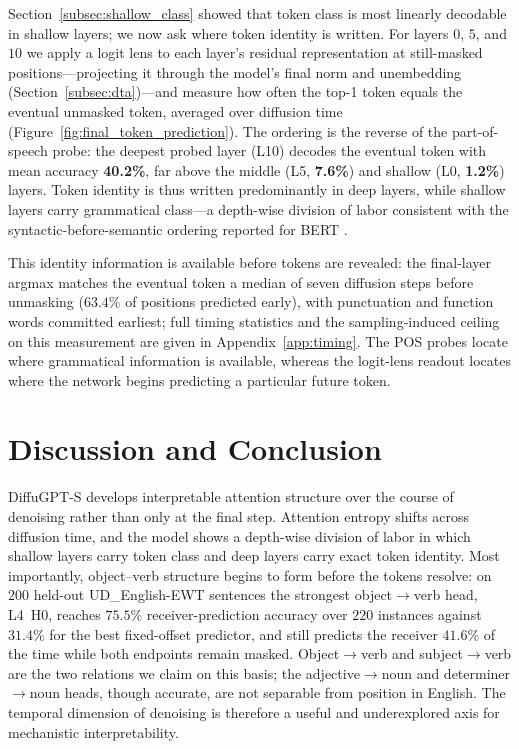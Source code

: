 \documentclass{article} %
\begin{document}
Section~\ref{subsec:shallow_class} showed that token class is most linearly
decodable in shallow layers; we now ask where token identity is written. For
layers $0$, $5$, and $10$ we apply a logit lens \citep{nostalgebraist2020logitlens} to each layer's residual
representation at still-masked positions---projecting it through the model's final
norm and unembedding (Section~\ref{subsec:dta})---and measure how often the top-1
token equals the eventual unmasked token, averaged over diffusion time
(Figure~\ref{fig:final_token_prediction}). The ordering is the reverse of the
part-of-speech probe: the deepest probed layer (L10) decodes the eventual token
with mean accuracy \textbf{40.2\%}, far above the middle (L5, \textbf{7.6\%}) and
shallow (L0, \textbf{1.2\%}) layers. Token identity is thus written predominantly
in deep layers, while shallow layers carry grammatical class---a depth-wise
division of labor consistent with the syntactic-before-semantic ordering reported
for BERT \citep{tenney-etal-2019-bert}.

This identity information is available before tokens are revealed: the final-layer argmax matches the eventual token a median of seven diffusion steps before unmasking ($63.4\%$ of positions predicted early), with punctuation and function words committed earliest; full timing statistics and the sampling-induced ceiling on this measurement are given in Appendix~\ref{app:timing}. The POS probes locate where grammatical information is available, whereas the logit-lens readout locates where the network begins predicting a particular future token.

\section{Discussion and Conclusion}

DiffuGPT-S develops interpretable attention structure over the course of denoising rather than only at the final step. Attention entropy shifts across diffusion time, and the model shows a depth-wise division of labor in which shallow layers carry token class and deep layers carry exact token identity. Most importantly, object--verb structure begins to form before the tokens resolve: on $200$ held-out UD\_English-EWT sentences the strongest object$\rightarrow$verb head, L4~H0, reaches $75.5\%$ receiver-prediction accuracy over $220$ instances against $31.4\%$ for the best fixed-offset predictor, and still predicts the receiver $41.6\%$ of the time while both endpoints remain masked. Object$\to$verb and subject$\to$verb are the two relations we claim on this basis; the adjective$\to$noun and determiner$\to$noun heads, though accurate, are not separable from position in English. The temporal dimension of denoising is therefore a useful and underexplored axis for mechanistic interpretability.
\end{document}
